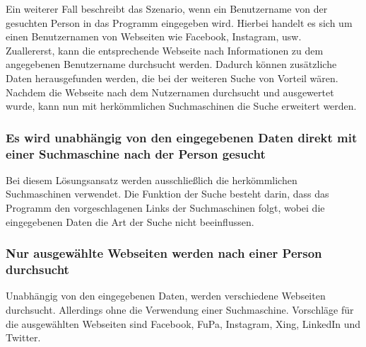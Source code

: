 		Ein weiterer Fall beschreibt das Szenario, wenn ein Benutzername von der gesuchten Person in das Programm eingegeben wird. Hierbei handelt es sich um einen Benutzernamen von Webseiten wie Facebook, Instagram, usw.\\
		Zuallererst, kann die entsprechende Webseite nach Informationen zu dem angegebenen Benutzername durchsucht werden. Dadurch können zusätzliche Daten herausgefunden werden, die bei der weiteren Suche von Vorteil wären. \\
		Nachdem die Webseite nach dem Nutzernamen durchsucht und ausgewertet wurde, kann nun mit herkömmlichen Suchmaschinen die Suche erweitert werden.
		\subsubsection{Es wird unabhängig von den eingegebenen Daten direkt mit einer Suchmaschine nach der Person gesucht}
		Bei diesem Lösungsansatz werden ausschließlich die herkömmlichen Suchmaschinen verwendet. Die Funktion der Suche besteht darin, dass das Programm den vorgeschlagenen Links der Suchmaschinen folgt, wobei die eingegebenen Daten die Art der Suche nicht beeinflussen.
		\subsubsection{Nur ausgewählte Webseiten werden nach einer Person durchsucht}
		Unabhängig von den eingegebenen Daten, werden verschiedene Webseiten durchsucht. Allerdings ohne die Verwendung einer Suchmaschine. Vorschläge für die ausgewählten Webseiten sind Facebook, FuPa, Instagram, Xing, LinkedIn und Twitter.
	

